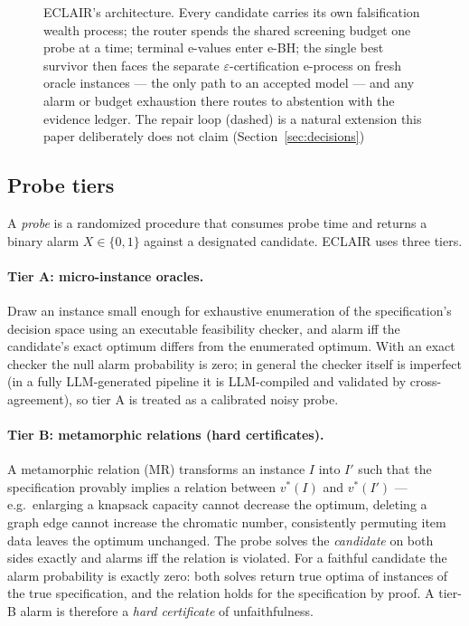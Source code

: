 \documentclass[pdflatex,sn-mathphys-num]{sn-jnl}
\theoremstyle{thmstyleone}
\theoremstyle{thmstyletwo}
\newcommand{\Eproc}{E}
\begin{document}
\begin{figure}[t]
\caption{ECLAIR's architecture. Every candidate carries its own
falsification wealth process; the router spends the shared screening
budget one probe at a time; terminal e-values enter e-BH; the single
best survivor then faces the separate $\varepsilon$-certification
e-process on fresh oracle instances --- the only path to an accepted
model --- and any alarm or budget exhaustion there routes to
abstention with the evidence ledger. The repair loop (dashed) is a
natural extension this paper deliberately does not claim
(Section~\ref{sec:decisions})}
\label{fig:arch}
\end{figure}

\subsection{Probe tiers}\label{sec:probes}

A \emph{probe} is a randomized procedure that consumes probe time
and returns a binary alarm $X \in \{0,1\}$ against a designated
candidate. ECLAIR uses three tiers.

\paragraph{Tier A: micro-instance oracles.}
Draw an instance small enough for exhaustive enumeration of the
specification's decision space using an executable feasibility
checker, and alarm iff the candidate's exact optimum differs from the
enumerated optimum. With an exact checker the null alarm probability
is zero; in general the checker itself is imperfect (in a fully
LLM-generated pipeline it is LLM-compiled and validated by
cross-agreement), so tier A is treated as a calibrated noisy probe.

\paragraph{Tier B: metamorphic relations (hard certificates).}
A metamorphic relation (MR) transforms an instance $I$ into $I'$ such
that the specification provably implies a relation between $v^\ast(I)$
and $v^\ast(I')$ --- e.g.\ enlarging a knapsack capacity cannot
decrease the optimum, deleting a graph edge cannot increase the
chromatic number, consistently permuting item data leaves the optimum
unchanged. The probe solves the \emph{candidate} on both sides
exactly and alarms iff the relation is violated. For a faithful
candidate the alarm probability is exactly zero: both solves return
true optima of instances of the true specification, and the relation
holds for the specification by proof. A tier-B alarm is therefore a
\emph{hard certificate} of unfaithfulness.
\end{document}

